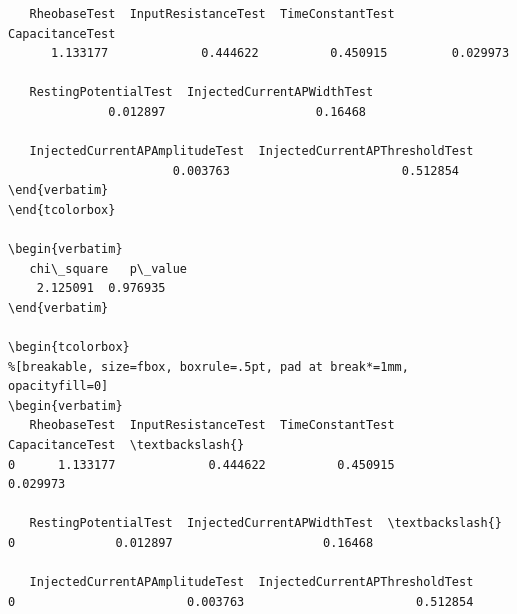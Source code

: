 \begin{tcolorbox}%
\begin{Verbatim}
   RheobaseTest  InputResistanceTest  TimeConstantTest  CapacitanceTest  
      1.133177             0.444622          0.450915         0.029973

   RestingPotentialTest  InjectedCurrentAPWidthTest  
              0.012897                     0.16468

   InjectedCurrentAPAmplitudeTest  InjectedCurrentAPThresholdTest
                       0.003763                        0.512854
\end{verbatim}
\end{tcolorbox}

\begin{verbatim}
   chi\_square   p\_value
    2.125091  0.976935
\end{verbatim}

\begin{tcolorbox}
%[breakable, size=fbox, boxrule=.5pt, pad at break*=1mm, opacityfill=0]
\begin{verbatim}
   RheobaseTest  InputResistanceTest  TimeConstantTest  CapacitanceTest  \textbackslash{}
0      1.133177             0.444622          0.450915         0.029973

   RestingPotentialTest  InjectedCurrentAPWidthTest  \textbackslash{}
0              0.012897                     0.16468

   InjectedCurrentAPAmplitudeTest  InjectedCurrentAPThresholdTest
0                        0.003763                        0.512854
\end{Verbatim}
\end{tcolorbox}
        
